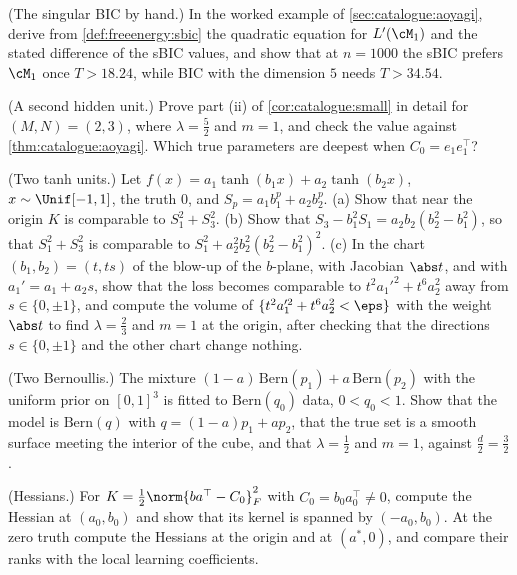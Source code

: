 \begin{refsection}
\begin{exercises}
\item \consolidation (The singular BIC by hand.)\label{ex:catalogue:sbic} In the worked example of \cref{sec:catalogue:aoyagi}, derive from \cref{def:freeenergy:sbic} the quadratic equation for $L'(\cM_1)$ and the stated difference of the sBIC values, and show that at $n=1000$ the sBIC prefers $\cM_1$ once $T>18.24$, while BIC with the dimension $5$ needs $T>34.54$.

\item \byhand (A second hidden unit.)\label{ex:catalogue:htwo} Prove part (ii) of \cref{cor:catalogue:small} in detail for $(M,N)=(2,3)$, where $\lambda=\frac52$ and $m=1$, and check the value against \cref{thm:catalogue:aoyagi}. Which true parameters are deepest when $C_0=e_1e_1^\top$?

\item \byhand\hard (Two tanh units.)\label{ex:catalogue:twotanh} Let $f(x)=a_1\tanh(b_1x)+a_2\tanh(b_2x)$, $x\sim\Unif[-1,1]$, the truth $0$, and $S_p=a_1b_1^p+a_2b_2^p$. (a) Show that near the origin $K$ is comparable to $S_1^2+S_3^2$. (b) Show that $S_3-b_1^2S_1=a_2b_2(b_2^2-b_1^2)$, so that $S_1^2+S_3^2$ is comparable to $S_1^2+a_2^2b_2^2(b_2^2-b_1^2)^2$. (c) In the chart $(b_1,b_2)=(t,ts)$ of the blow-up of the $b$-plane, with Jacobian $\abs t$, and with $a_1'=a_1+a_2s$, show that the loss becomes comparable to $t^2a_1'^2+t^6a_2^2$ away from $s\in\{0,\pm1\}$, and compute the volume of $\{t^2a_1'^2+t^6a_2^2<\eps\}$ with the weight $\abs t$ to find $\lambda=\frac23$ and $m=1$ at the origin, after checking that the directions $s\in\{0,\pm1\}$ and the other chart change nothing. 

\item \byhand (Two Bernoullis.)\label{ex:catalogue:bernoulli} The mixture $(1-a)\,\mathrm{Bern}(p_1)+a\,\mathrm{Bern}(p_2)$ with the uniform prior on $[0,1]^3$ is fitted to $\mathrm{Bern}(q_0)$ data, $0<q_0<1$. Show that the model is $\mathrm{Bern}(q)$ with $q=(1-a)p_1+ap_2$, that the true set is a smooth surface meeting the interior of the cube, and that $\lambda=\frac12$ and $m=1$, against $\frac d2=\frac32$.

\item \byhand (Hessians.)\label{ex:catalogue:hessian} For $K=\frac12\norm{ba^\top-C_0}_F^2$ with $C_0=b_0a_0^\top\ne0$, compute the Hessian at $(a_0,b_0)$ and show that its kernel is spanned by $(-a_0,b_0)$. At the zero truth compute the Hessians at the origin and at $(a^*,0)$, and compare their ranks with the local learning coefficients.


\end{exercises}
\end{refsection}

